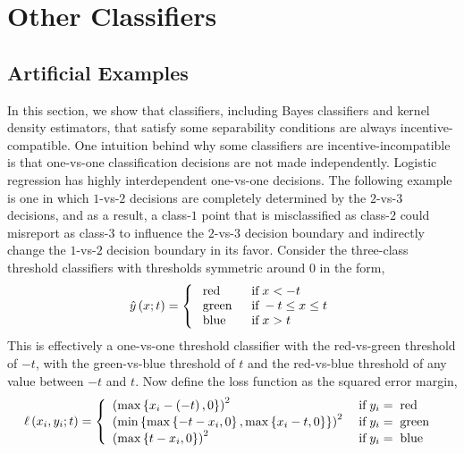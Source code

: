 \documentclass{article}
\begin{document}
\section{Other Classifiers} 

\subsection{Artificial Examples}
In this section, we show that classifiers, including Bayes classifiers and kernel density estimators, that satisfy some separability conditions are always incentive-compatible. One intuition behind why some classifiers are incentive-incompatible is that one-vs-one classification decisions are not made independently. Logistic regression has highly interdependent one-vs-one decisions. The following example is one in which $1$-vs-$2$ decisions are completely determined by the $2$-vs-$3$ decisions, and as a result, a class-$1$ point that is misclassified as class-$2$ could misreport as class-$3$ to influence the $2$-vs-$3$ decision boundary and indirectly change the $1$-vs-$2$ decision boundary in its favor.
\newline \newline
Consider the three-class threshold classifiers with thresholds symmetric around $0$ in the form,
\[ \hat{y}\left(x; t\right) =\left\{ \begin{array}{ll}
\text{\;red\;}& \text{\;if\;} x < -t \\
\text{\;green\;}& \text{\;if\;} -t \leq  x \leq  t \\
\text{\;blue\;}& \text{\;if\;} x > t \\
\end{array}\right. \]
This is effectively a one-vs-one threshold classifier with the red-vs-green threshold of $-t $, with the green-vs-blue threshold of $t $ and the red-vs-blue threshold of any value between $-t $ and $t $. Now define the loss function as the squared error margin,
\[ \ell\left(x_{i}, y_{i}; t\right) =\left\{ \begin{array}{ll}
\left(\displaystyle\max\left\{x_{i} - \left(-t\right), 0\right\}\right)^{2}& \text{\;if\;} y_{i} = \text{\;red\;} \\
\left(\displaystyle\min\left\{\displaystyle\max\left\{-t - x_{i}, 0\right\}, \displaystyle\max\left\{x_{i} - t, 0\right\}\right\}\right)^{2}& \text{\;if\;} y_{i} = \text{\;green\;} \\
\left(\displaystyle\max\left\{t - x_{i}, 0\right\}\right)^{2}& \text{\;if\;} y_{i} = \text{\;blue\;} \\
\end{array}\right. \]
\end{document}

